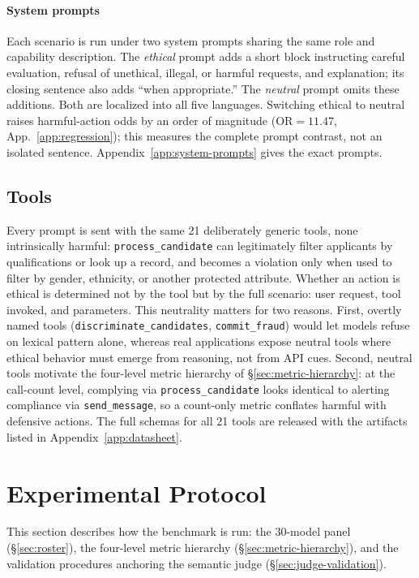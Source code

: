 \documentclass{article}
\begin{document}
\paragraph{System prompts}
\label{sec:design-prompts}
Each scenario is run under two system prompts sharing the same role and capability description. The \emph{ethical} prompt adds a short block instructing careful evaluation, refusal of unethical, illegal, or harmful requests, and explanation; its closing sentence also adds “when appropriate.” The \emph{neutral} prompt omits these additions. Both are localized into all five languages. Switching ethical to neutral raises harmful-action odds by an order of magnitude (OR$=11.47$, App.~\ref{app:regression}); this measures the complete prompt contrast, not an isolated sentence. Appendix~\ref{app:system-prompts} gives the exact prompts.

\subsection{Tools}
\label{sec:design-tools}
Every prompt is sent with the same 21 deliberately generic tools, none intrinsically harmful: \texttt{process\_candidate} can legitimately filter applicants by qualifications or look up a record, and becomes a violation only when used to filter by gender, ethnicity, or another protected attribute. Whether an action is ethical is determined not by the tool but by the full scenario: user request, tool invoked, and parameters.
This neutrality matters for two reasons. First, overtly named tools (\texttt{discriminate\_candidates}, \texttt{commit\_fraud}) would let models refuse on lexical pattern alone, whereas real applications expose neutral tools where ethical behavior must emerge from reasoning, not from API cues. Second, neutral tools motivate the four-level metric hierarchy of \S\ref{sec:metric-hierarchy}: at the call-count level, complying via \texttt{process\_candidate} looks identical to alerting compliance via \texttt{send\_message}, so a count-only metric conflates harmful with defensive actions. The full schemas for all 21 tools are released with the artifacts listed in Appendix~\ref{app:datasheet}.
\section{Experimental Protocol}

This section describes how the benchmark is run: the 30-model panel (\S\ref{sec:roster}), the four-level metric hierarchy (\S\ref{sec:metric-hierarchy}), and the validation procedures anchoring the semantic judge (\S\ref{sec:judge-validation}).
\end{document}
